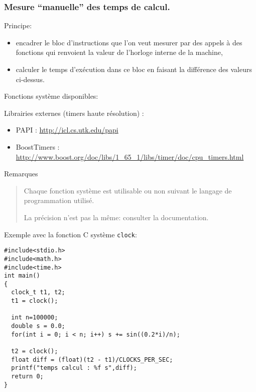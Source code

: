 \documentclass{beamer}
\begin{document}
\begin{frame}[fragile]
\frametitle{Mesure ``manuelle'' des temps de calcul.}

Principe: 
\begin{itemize}
	\item encadrer le bloc d'instructions que l'on veut mesurer par des appels \`a des fonctions qui renvoient la valeur de l'horloge interne de la machine,
	\item calculer le temps d'ex\'ecution dans ce bloc en faisant la diff\'erence des valeurs ci-dessus.
\end{itemize}
\vfill

Fonctions syst\`eme disponibles:
\vfill
\end{frame}


\begin{frame}
Librairies externes (timers haute r\'esolution) :
\begin{itemize}
	\item PAPI : \url{http://icl.cs.utk.edu/papi}
	\item BoostTimers : \url{http://www.boost.org/doc/libs/1_65_1/libs/timer/doc/cpu_timers.html}
\end{itemize}
\vfill

Remarques
\begin{quote}
	Chaque fonction syst\`eme est utilisable ou non suivant le langage de programmation utilis\'e.
	
	La pr\'ecision n'est pas la m\^eme: consulter la documentation.
\end{quote}
\vfill
\end{frame}


\begin{frame}[fragile]

Exemple avec la fonction C syst\`eme {\tt clock}:

\vfill
\begin{lstlisting}
#include<stdio.h>   
#include<math.h>   
#include<time.h>   
int main()   
{   
  clock_t t1, t2;
  t1 = clock();   
	
  int n=100000;
  double s = 0.0;
  for(int i = 0; i < n; i++) s += sin((0.2*i)/n);  
	
  t2 = clock();   
  float diff = (float)(t2 - t1)/CLOCKS_PER_SEC;   
  printf("temps calcul : %f s",diff);   
  return 0;   
}
\end{lstlisting}

\end{frame}
\end{document}
